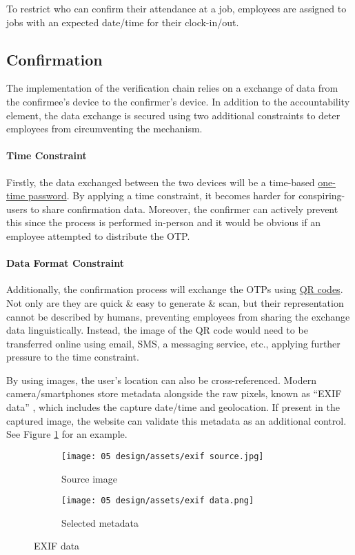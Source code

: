 To restrict who can confirm their attendance at a job,
employees are assigned to jobs with an expected date/time
for their clock-in/out.

\subsection{Confirmation}

The implementation of the verification chain relies on a
exchange of data from the \gls{confirmee}'s device to the
\gls{confirmer}'s device.
In addition to the accountability element, the data
exchange is secured using two additional constraints to
deter employees from circumventing the mechanism.

\paragraph{Time Constraint}

Firstly, the data exchanged between the two devices will be
a time-based \hyperref[ss:otp]{one-time password}.
By applying a time constraint, it becomes harder for
\gls{conspiring-users} to share confirmation data.
Moreover, the confirmer can actively prevent this since the
process is performed in-person and it would be obvious if
an employee attempted to distribute the OTP.

\paragraph{Data Format Constraint}

Additionally, the confirmation process will exchange the
OTPs using \hyperref[ss:barcodes]{QR codes}.
Not only are they are quick \& easy to generate \& scan,
but their representation cannot be described by humans,
preventing employees from sharing the exchange data
linguistically.
Instead, the image of the QR code would need to be
transferred online using email, SMS, a messaging service,
etc., applying further pressure to the time constraint.

By using images, the user's location can also be
cross-referenced.
Modern camera/smartphones store metadata alongside the raw
pixels, known as \enquote{EXIF data} \parencite{exif},
which includes the capture date/time and geolocation.
If present in the captured image, the website can validate
this metadata as an additional control.
See Figure \ref{fig:exif} for an example.

\begin{figure}[h]
  \centering

  \begin{subfigure}{\subfigwidth}
    \centering
    \texttt{[image: 05
      design/assets/exif source.jpg]}
    \caption{Source image}
  \end{subfigure}
  \begin{subfigure}{\subfigwidth}
    \centering
    \texttt{[image: 05
      design/assets/exif data.png]}
    \caption{Selected metadata}
  \end{subfigure}

  \caption{EXIF data}
  \label{fig:exif}
\end{figure}

